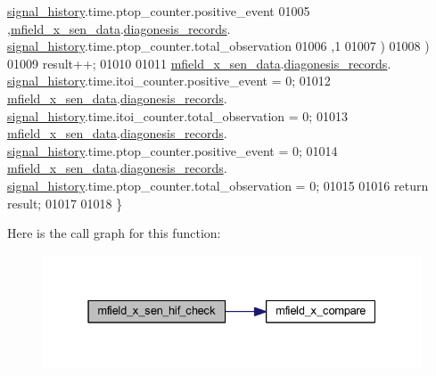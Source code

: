 \begin{DoxyCode}
      \hyperlink{a00019_ab7038f4de1f77b52a7f89e9f77c0b846}{signal\_history}.time.ptop\_counter.positive\_event
01005          ,\hyperlink{a00052_af8c531b1ba5fea148fb9111e06058f92}{mfield\_x\_sen\_data}.\hyperlink{a00025_a2bd79ce84bbd6b7f50d38954f7ae475e}{diagonesis\_records}.
      \hyperlink{a00019_ab7038f4de1f77b52a7f89e9f77c0b846}{signal\_history}.time.ptop\_counter.total\_observation
01006          ,1
01007           )
01008        )
01009         result++;
01010 
01011     \hyperlink{a00052_af8c531b1ba5fea148fb9111e06058f92}{mfield\_x\_sen\_data}.\hyperlink{a00025_a2bd79ce84bbd6b7f50d38954f7ae475e}{diagonesis\_records}.
      \hyperlink{a00019_ab7038f4de1f77b52a7f89e9f77c0b846}{signal\_history}.time.itoi\_counter.positive\_event      = 0;
01012     \hyperlink{a00052_af8c531b1ba5fea148fb9111e06058f92}{mfield\_x\_sen\_data}.\hyperlink{a00025_a2bd79ce84bbd6b7f50d38954f7ae475e}{diagonesis\_records}.
      \hyperlink{a00019_ab7038f4de1f77b52a7f89e9f77c0b846}{signal\_history}.time.itoi\_counter.total\_observation   = 0;
01013     \hyperlink{a00052_af8c531b1ba5fea148fb9111e06058f92}{mfield\_x\_sen\_data}.\hyperlink{a00025_a2bd79ce84bbd6b7f50d38954f7ae475e}{diagonesis\_records}.
      \hyperlink{a00019_ab7038f4de1f77b52a7f89e9f77c0b846}{signal\_history}.time.ptop\_counter.positive\_event      = 0;
01014     \hyperlink{a00052_af8c531b1ba5fea148fb9111e06058f92}{mfield\_x\_sen\_data}.\hyperlink{a00025_a2bd79ce84bbd6b7f50d38954f7ae475e}{diagonesis\_records}.
      \hyperlink{a00019_ab7038f4de1f77b52a7f89e9f77c0b846}{signal\_history}.time.ptop\_counter.total\_observation   = 0;
01015 
01016     \textcolor{keywordflow}{return} result;
01017 
01018 \}
\end{DoxyCode}


Here is the call graph for this function\+:\nopagebreak
\begin{figure}[H]
\begin{center}
\leavevmode
\includegraphics[width=331pt]{d1/d84/a00052_ad309ab77ec43baa60232db1809199756_cgraph}
\end{center}
\end{figure}


